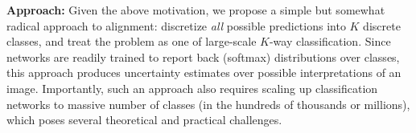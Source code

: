 \documentclass[letterpaper]{article} %
\begin{document}
{\bf Approach:} Given the above motivation, we propose a simple but somewhat radical approach to alignment: discretize {\em all} possible predictions into $K$ discrete classes, and treat the problem as one of large-scale $K$-way classification. Since networks are readily trained to report back (softmax) distributions over classes, this approach produces uncertainty estimates over possible interpretations of an image. Importantly, such an approach also requires scaling up classification networks to massive number of classes (in the hundreds of thousands or millions), which poses several theoretical and practical challenges.
\end{document}

